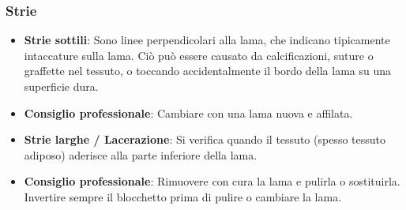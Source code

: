 \subsubsection{Strie}
\begin{itemize}
    \item   \textbf{Strie sottili}: Sono linee perpendicolari alla lama, che indicano tipicamente intaccature sulla lama.  Ciò può essere causato da calcificazioni, suture o graffette nel tessuto, o toccando accidentalmente il bordo della lama su una superficie dura. 
    \item   \textbf{Consiglio professionale}: Cambiare con una lama nuova e affilata. 
    \item   \textbf{Strie larghe / Lacerazione}: Si verifica quando il tessuto (spesso tessuto adiposo) aderisce alla parte inferiore della lama. 
    \item   \textbf{Consiglio professionale}: Rimuovere con cura la lama e pulirla o sostituirla.  Invertire sempre il blocchetto prima di pulire o cambiare la lama. 
\end{itemize}

